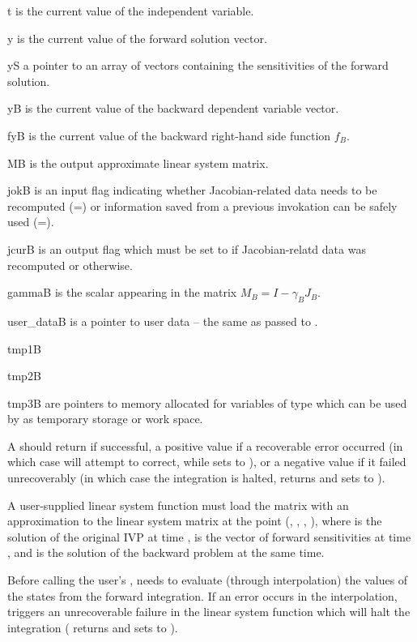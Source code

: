 {
  \begin{args}
  \item[t]
    is the current value of the independent variable.
  \item[y]
    is the current value of the forward solution vector.
  \item[yS]
    a pointer to an array of  vectors containing the sensitivities
    of the forward solution.
  \item[yB]
    is the current value of the backward dependent variable vector.
  \item[fyB]
    is the current value of the backward right-hand side function $f_B$.
  \item[MB]
    is the output approximate linear system matrix.
  \item[jokB]
    is an input flag indicating whether Jacobian-related
    data needs to be recomputed (=) or information saved
    from a previous invokation can be safely used (=).
  \item[jcurB]
    is an output flag which must be set to  if Jacobian-relatd data
    was recomputed or  otherwise.
  \item[gammaB]
    is the scalar appearing in the matrix $M_B = I - \gamma_B J_B$.
  \item[user\_dataB]
    is a pointer to user data -- the same as passed to .
  \item[tmp1B]
  \item[tmp2B]
  \item[tmp3B]
    are pointers to memory allocated  for variables of type  which
    can be used by  as temporary storage or work space.
  \end{args}
}
{
  A  should return  if successful, a positive value if
  a recoverable error occurred (in which case {\cvodes} will attempt to correct,
  while {\cvls} sets  to ), or a
  negative value if it failed unrecoverably (in which case the integration is
  halted,  returns  and {\cvls} sets
   to ).
}
{
  A user-supplied linear system function must load the matrix  with an
  approximation to the linear system matrix at the point (, ,
  , ), where  is the solution of the original IVP at time
  ,  is the vector of forward sensitivities at time , and
   is the solution of the backward problem at the same time.

  {\warn}Before calling the user's , {\cvodes} needs to
  evaluate (through interpolation) the values of the states from the forward
  integration.  If an error occurs in the interpolation, {\cvodes} triggers an
  unrecoverable failure in the linear system function which will halt the
  integration ( returns  and {\cvls} sets
   to ).
}


